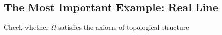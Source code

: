 \subsection{The Most Important Example: Real Line}

\begin{majorEx} %
  Check whether $\Omega$  satisfies the axioms of topological structure
\end{majorEx}